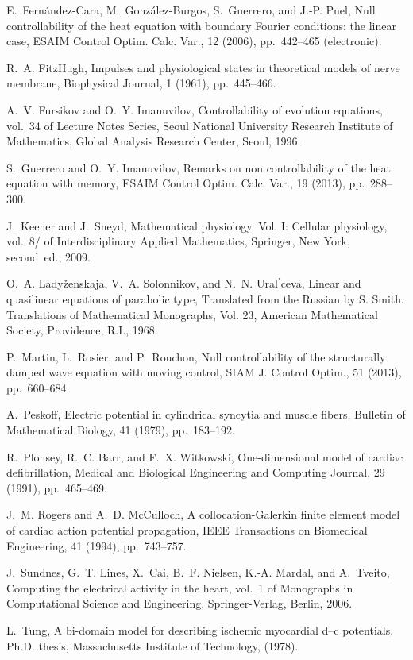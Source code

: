 \documentclass[10pt]{article}
\begin{document}
\begin{thebibliography}{10}
{ E.~Fern{\'a}ndez-Cara, M.~Gonz{\'a}lez-Burgos, S.~Guerrero, and J.-P.
  Puel}, { Null controllability of the heat equation with boundary {F}ourier
  conditions: the linear case}, ESAIM Control Optim. Calc. Var., 12 (2006),
  pp.~442--465 (electronic).

{ R.~A. FitzHugh}, {Impulses and physiological states in theoretical
  models of nerve membrane}, Biophysical Journal, 1 (1961), pp.~445--466.

{A.~V. Fursikov and O.~Y. Imanuvilov}, { {Controllability of evolution
  equations}}, vol.~34 of {Lecture Notes Series}, Seoul National University
  Research Institute of Mathematics, Global Analysis Research Center, Seoul,
  1996.

{ S.~Guerrero and O.~Y. Imanuvilov}, {Remarks on non controllability of
  the heat equation with memory}, ESAIM Control Optim. Calc. Var., 19 (2013),
  pp.~288--300.

{ J.~Keener and J.~Sneyd}, { Mathematical physiology. {V}ol. {I}:
  {C}ellular physiology}, vol.~8/ of Interdisciplinary Applied Mathematics,
  Springer, New York, second~ed., 2009.

{O.~A. Lady\v{z}enskaja, V.~A. Solonnikov, and N.~N. Ural$^\prime$ceva},
  { Linear and quasilinear equations of parabolic type}, Translated from the
  Russian by S. Smith. Translations of Mathematical Monographs, Vol. 23,
  American Mathematical Society, Providence, R.I., 1968.

{P.~Martin, L.~Rosier, and P.~Rouchon}, { Null controllability of the
  structurally damped wave equation with moving control}, SIAM J. Control
  Optim., 51 (2013), pp.~660--684.

{A.~Peskoff}, { Electric potential in cylindrical syncytia and muscle
  fibers}, Bulletin of Mathematical Biology, 41 (1979), pp.~183--192.

{ R.~Plonsey, R.~C. Barr, and F.~X. Witkowski}, { One-dimensional model
  of cardiac defibrillation}, Medical and Biological Engineering and Computing
  Journal, 29 (1991), pp.~465--469.

{J.~M. Rogers and A.~D. McCulloch}, { A collocation-{G}alerkin finite
  element model of cardiac action potential propagation}, IEEE Transactions on
  Biomedical Engineering, 41 (1994), pp.~743--757.

{J.~Sundnes, G.~T. Lines, X.~Cai, B.~F. Nielsen, K.-A. Mardal, and
  A.~Tveito}, { Computing the electrical activity in the heart}, vol.~1 of
  Monographs in Computational Science and Engineering, Springer-Verlag, Berlin,
  2006.

{ L.~Tung}, { A bi-domain model for describing ischemic myocardial d--c
  potentials}, Ph.D. thesis, Massachusetts Institute of Technology,  (1978).

\end{thebibliography}
%
\end{document}
